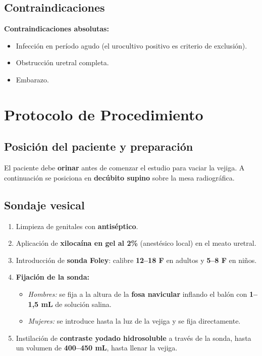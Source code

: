 \clearpage

\subsection*{Contraindicaciones}

\begin{cajariesgo}
\textbf{Contraindicaciones absolutas:}
\begin{itemize}[noitemsep, topsep=2pt]
  \item Infección en período agudo (el urocultivo positivo es criterio de exclusión).
  \item Obstrucción uretral completa.
  \item Embarazo.
\end{itemize}
\end{cajariesgo}

\section*{Protocolo de Procedimiento}

\subsection*{Posición del paciente y preparación}

El paciente debe \textbf{orinar} antes de comenzar el estudio para vaciar la vejiga. A continuación se posiciona en \textbf{decúbito supino} sobre la mesa radiográfica.

\subsection*{Sondaje vesical}

\begin{enumerate}[noitemsep]
  \item Limpieza de genitales con \textbf{antiséptico}.
  \item Aplicación de \textbf{xilocaína en gel al 2\%} (anestésico local) en el meato uretral.
  \item Introducción de \textbf{sonda Foley}: calibre \textbf{12--18 F} en adultos y \textbf{5--8 F} en niños.
  \item \textbf{Fijación de la sonda:}
    \begin{itemize}[noitemsep]
      \item \textit{Hombres:} se fija a la altura de la \textbf{fosa navicular} inflando el balón con \textbf{1--1,5 mL} de solución salina.
      \item \textit{Mujeres:} se introduce hasta la luz de la vejiga y se fija directamente.
    \end{itemize}
  \item Instilación de \textbf{contraste yodado hidrosoluble} a través de la sonda, hasta un volumen de \textbf{400--450 mL}, hasta llenar la vejiga.
\end{enumerate}

